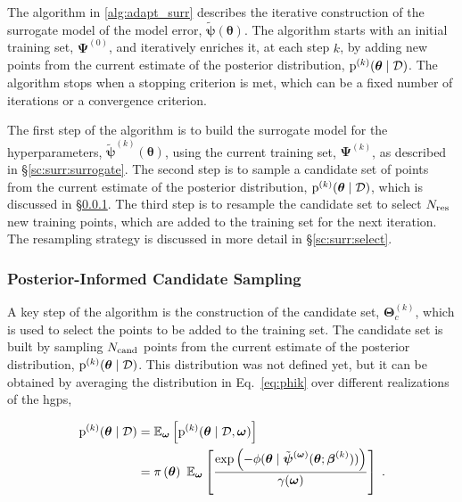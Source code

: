 The algorithm in \ref{alg:adapt_surr} describes the iterative construction of the surrogate model of the model error, $\tilde{\boldsymbol{\psi}}(\boldsymbol{\theta})$. The algorithm starts with an initial training set, $\boldsymbol{\Psi}^{(0)}$, and iteratively enriches it, at each step $k$, by adding new points from the current estimate of the posterior distribution, $\mathrm{p}^{(k)}(\boldsymbol{\theta} \mid \mathcal{D})$. The algorithm stops when a stopping criterion is met, which can be a fixed number of iterations or a convergence criterion.

\smallskip
The first step of the algorithm is to build the surrogate model for the hyperparameters, $\tilde{\boldsymbol{\psi}}^{(k)}(\boldsymbol{\theta})$, using the current training set, $\boldsymbol{\Psi}^{(k)}$, as described in \S\ref{sc:surr:surrogate}. The second step is to sample a candidate set of points from the current estimate of the posterior distribution, $\mathrm{p}^{(k)}(\boldsymbol{\theta} \mid \mathcal{D})$, which is discussed in \S\ref{sc:surr:candidate}. The third step is to resample the candidate set to select ${N_{\mathrm{res}}}$ new training points, which are added to the training set for the next iteration. The resampling strategy is discussed in more detail in \S\ref{sc:surr:select}.

\subsubsection{Posterior-Informed Candidate Sampling}
\label{sc:surr:candidate}

A key step of the algorithm is the construction of the candidate set, $\boldsymbol{\Theta}_c^{(k)}$, which is used to select the points to be added to the training set. The candidate set is built by sampling $N_{\mathrm{cand}}$ points from the current estimate of the posterior distribution, $\mathrm{p}^{(k)}(\boldsymbol{\theta} \mid \mathcal{D})$. This distribution was not defined yet, but it can be obtained by averaging the distribution in Eq.~\eqref{eq:phik} over different realizations of the \glspl{hgp},

\begin{equation}
  \left.
    \begin{aligned}
      \mathrm{p}^{(k)}(\boldsymbol{\theta} \mid \data) &= \mathbb{E}_{\boldsymbol{\omega}} \left[\mathrm{p}^{(k)}(\boldsymbol{\theta} \mid \data, \boldsymbol{\omega})\right]\\
      &=\prior{\boldsymbol{\theta}} \ \mathbb{E}_{\boldsymbol{\omega}} \left[ \dfrac{\exp \left(-\phi(\boldsymbol{\theta} \mid \tilde{\boldsymbol{\psi}}^{(\boldsymbol{\omega})}(\boldsymbol{\theta}; \boldsymbol{\beta}^{(k)})) \right)}{\gamma(\boldsymbol{\omega})} \right]\;.
    \end{aligned}
  \right.
    \label{eq:avg_dist}
\end{equation}

